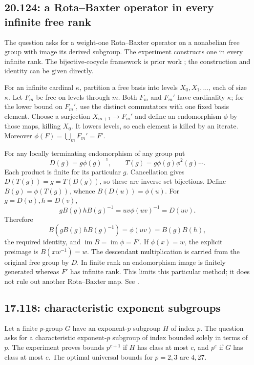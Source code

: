 \subsection{20.124: a Rota--Baxter operator in every infinite free rank}
\label{partial:rb}

The question asks for a weight-one Rota--Baxter operator on a
nonabelian free group with image its derived subgroup.
The experiment constructs one in every infinite rank.
The bijective-cocycle framework is prior work
\cite{bardakov-gubarev,guo-lang-sheng}; the construction and
identity can be given directly.

For an infinite cardinal \(\kappa\), partition a free basis
into levels \(X_0,X_1,\ldots\), each of size \(\kappa\).
Let \(F_m\) be free on levels through \(m\).
Both \(F_m\) and \(F_m'\) have cardinality \(\kappa\); for
the lower bound on \(F_m'\), use the distinct commutators
with one fixed basis element. Choose a surjection
\(X_{m+1}\to F_m'\) and define an endomorphism \(\phi\)
by those maps, killing \(X_0\).
It lowers levels, so each element is killed by an iterate.
Moreover \(\phi(F)=\bigcup_m F_m'=F'\).

For any locally terminating endomorphism of any group put
\[
 D(g)=g\phi(g)^{-1},\qquad
 T(g)=g\phi(g)\phi^2(g)\cdots.
\]
Each product is finite for its particular \(g\).
Cancellation gives \(D(T(g))=g=T(D(g))\), so these are inverse
set bijections. Define \(B(g)=\phi(T(g))\), whence
\(B(D(u))=\phi(u)\). For \(g=D(u),h=D(v)\),
\[
 gB(g)hB(g)^{-1}=uv\phi(uv)^{-1}=D(uv).
\]
Therefore
\[
 B(gB(g)hB(g)^{-1})=\phi(uv)=B(g)B(h),
\]
the required identity, and \(\operatorname{im}B=\operatorname{im}\phi=F'\).
If \(\phi(x)=w\), the explicit preimage is \(B(xw^{-1})=w\).
The descendant multiplication is carried from the original
free group by \(D\).
In finite rank an endomorphism image is finitely generated
whereas \(F'\) has infinite rank. This limits this particular
method; it does not rule out another Rota--Baxter map.
See .

\subsection{17.118: characteristic exponent subgroups}
\label{partial:17.118}

Let a finite \(p\)-group \(G\) have an exponent-\(p\) subgroup
\(H\) of index \(p\). The question asks for a characteristic
exponent-\(p\) subgroup of index bounded solely in terms of \(p\).
The experiment proves bounds \(p^{c+1}\) if \(H\) has class
at most \(c\), and \(p^c\) if \(G\) has class at most \(c\).
The optimal universal bounds for \(p=2,3\) are \(4,27\).

